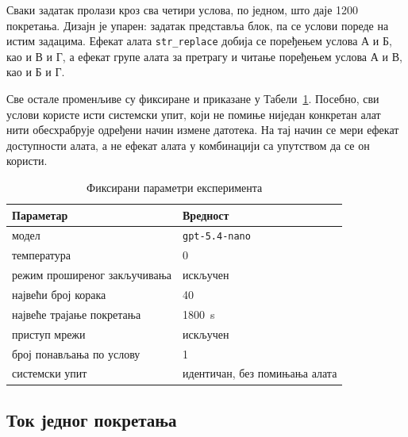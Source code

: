 \documentclass[12pt,a4paper]{report}
\newcommand{\tabelalevo}{\setstretch{1}\fontsize{11bp}{14.5bp}\selectfont
	\hspace*{\dimexpr-\tabcolsep-\arrayrulewidth+0.4bp\relax}}
\begin{document}
	Сваки задатак пролази кроз сва четири услова, по једном, што даје 1200
	покретања. Дизајн је упарен: задатак представља блок, па се услови пореде
	на истим задацима. Ефекат алата \texttt{str\_replace} добија се поређењем
	услова А и Б, као и В и Г, а ефекат групе алата за претрагу и читање
	поређењем услова А и В, као и Б и Г.

	Све остале променљиве су фиксиране и приказане у
	Табели~\ref{tab:parametri}. Посебно, сви услови користе исти системски
	упит, који не помиње ниједан конкретан алат нити обесхрабрује одређени
	начин измене датотека. На тај начин се мери ефекат доступности алата, а не
	ефекат алата у комбинацији са упутством да се он користи.

	\begin{table}[H]
		\caption{Фиксирани параметри експеримента}
		\label{tab:parametri}
		\tabelalevo
		\begin{tabular}{|l|l|}
			\hline
			Параметар & Вредност \\
			\hline
			модел & \texttt{gpt-5.4-nano} \\
			\hline
			температура & 0 \\
			\hline
			режим проширеног закључивања & искључен \\
			\hline
			највећи број корака & 40 \\
			\hline
			највеће трајање покретања & 1800~s \\
			\hline
			приступ мрежи & искључен \\
			\hline
			број понављања по услову & 1 \\
			\hline
			системски упит & идентичан, без помињања алата \\
			\hline
		\end{tabular}
	\end{table}

	\subsection{Ток једног покретања}
\end{document}
